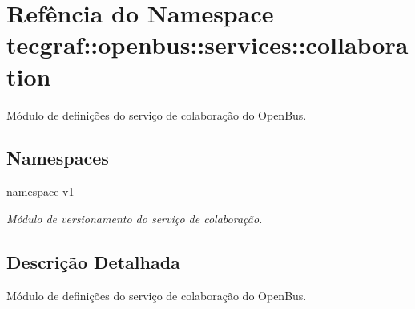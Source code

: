 \hypertarget{namespacetecgraf_1_1openbus_1_1services_1_1collaboration}{\section{\-Refência do \-Namespace tecgraf\-:\-:openbus\-:\-:services\-:\-:collaboration}
\label{namespacetecgraf_1_1openbus_1_1services_1_1collaboration}
}


\-Módulo de definições do serviço de colaboração do \-Open\-Bus.  


\subsection*{\-Namespaces}
\begin{DoxyCompactItemize}
\item 
namespace \hyperlink{namespacetecgraf_1_1openbus_1_1services_1_1collaboration_1_1v1__0}{v1\-\_}
\begin{DoxyCompactList}\small\item\em \-Módulo de versionamento do serviço de colaboração. \end{DoxyCompactList}\end{DoxyCompactItemize}


\subsection{\-Descrição \-Detalhada}
\-Módulo de definições do serviço de colaboração do \-Open\-Bus. 